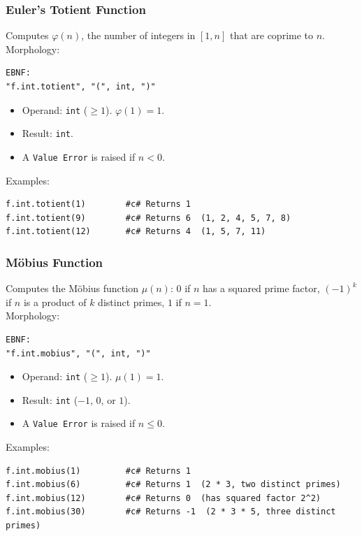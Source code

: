 \subsubsection{Euler's Totient Function}
Computes $\varphi(n)$, the number of integers in $[1, n]$ that are coprime to $n$. \\
Morphology:
\begin{verbatim}
EBNF:
"f.int.totient", "(", int, ")"
\end{verbatim}
\begin{itemize}
\item Operand: \texttt{int} ($\geq 1$). $\varphi(1) = 1$.
\item Result: \texttt{int}.
\item A \texttt{Value Error} is raised if $n < 0$.
\end{itemize}
Examples:
\begin{verbatim}
f.int.totient(1)        #c# Returns 1
f.int.totient(9)        #c# Returns 6  (1, 2, 4, 5, 7, 8)
f.int.totient(12)       #c# Returns 4  (1, 5, 7, 11)
\end{verbatim}

\subsubsection{M\"obius Function}
Computes the M\"obius function $\mu(n)$: $0$ if $n$ has a squared prime factor, $(-1)^k$ if $n$ is a product of $k$ distinct primes, $1$ if $n = 1$. \\
Morphology:
\begin{verbatim}
EBNF:
"f.int.mobius", "(", int, ")"
\end{verbatim}
\begin{itemize}
\item Operand: \texttt{int} ($\geq 1$). $\mu(1) = 1$.
\item Result: \texttt{int} ($-1$, $0$, or $1$).
\item A \texttt{Value Error} is raised if $n \leq 0$.
\end{itemize}
Examples:
\begin{verbatim}
f.int.mobius(1)         #c# Returns 1
f.int.mobius(6)         #c# Returns 1  (2 * 3, two distinct primes)
f.int.mobius(12)        #c# Returns 0  (has squared factor 2^2)
f.int.mobius(30)        #c# Returns -1  (2 * 3 * 5, three distinct primes)
\end{verbatim}


